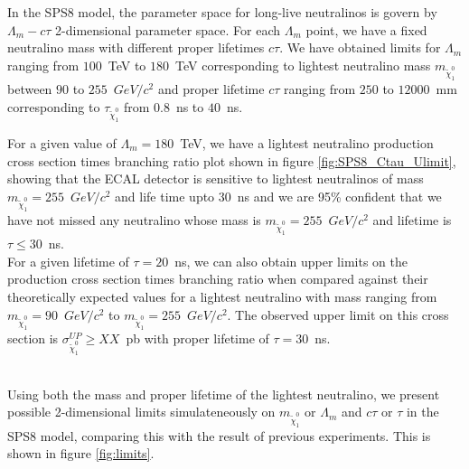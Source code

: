 In the SPS8 model, the parameter space for long-live neutralinos is govern by $\Lambda_{m}-c\tau$ 2-dimensional parameter space. For each $\Lambda_{m}$ point, we have a fixed neutralino mass with different proper lifetimes $c\tau$. We have obtained limits for $\Lambda_{m}$ ranging from $100$~TeV to $180$~TeV corresponding to lightest neutralino mass $m_{\tilde{\chi}^{0}_{1}}$ between $90$ to $255$~$GeV/c^{2}$ and proper lifetime $c\tau$ ranging from $250$ to $12000$~mm corresponding to $\tau_{\tilde{\chi}^{0}_{1}}$ from $0.8$~ns to $40$~ns.

For a given value of $\Lambda_{m} = 180$~TeV, we have a lightest neutralino production cross section times branching ratio plot shown in figure \ref{fig:SPS8_Ctau_Ulimit}, showing that the ECAL detector is sensitive to lightest neutralinos of mass $m_{\tilde{\chi}^{0}_{1}} = 255$~$GeV/c^{2}$ and life time upto $30$~ns and we are 95\% confident that we have not missed any neutralino whose mass is $m_{\tilde{\chi}^{0}_{1}} = 255$~$GeV/c^{2}$ and lifetime is $\tau \leq 30$~ns.
\mbox{}\\
For a given lifetime of $\tau = 20$~ns, we can also obtain upper limits on the production cross section times branching ratio when compared against their theoretically expected values for a lightest neutralino with mass ranging from $m_{\tilde{\chi}^{0}_{1}} = 90$~$GeV/c^{2}$ to $m_{\tilde{\chi}^{0}_{1}} = 255$~$GeV/c^{2}$. The observed upper limit on this cross section is $\sigma^{UP}_{\tilde{\chi}^{0}_{1}} \geq XX$~pb with proper lifetime of $\tau = 30$~ns.

\mbox{}\\
Using both the mass and proper lifetime of the lightest neutralino, we present possible 2-dimensional limits simulateneously on $m_{\tilde{\chi}^{0}_{1}}$ or $\Lambda_{m}$ and $c\tau$ or $\tau$ in the SPS8 model, comparing this with the result of previous experiments. This is shown in figure \ref{fig:limits}.

